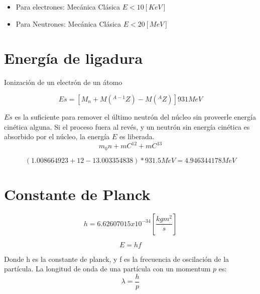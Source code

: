 \documentclass[]{article}
\begin{document}
\begin{itemize}
	\item Para electrones: Mecánica Clásica $E<10 [KeV]$
	\item Para Neutrones: Mecánica Clásica $E<20 [MeV]$
\end{itemize}









\section{Energía de ligadura}

Ionización de un electrón de un átomo

\begin{equation}
  Es=[M_n+M(^{A-1}Z)-M(^AZ)]931MeV
\end{equation}

$Es$ es la suficiente para remover el último neutrón del núcleo sin proveerle energía cinética alguna. Si el proceso fuera al revés, y un neutrón sin energía cinética es absorbido por el núcleo, la energía $E$ es liberada.\\

\begin{equation}
  m_0 n+mC^{12}+mC^{13}
\end{equation}

\begin{equation}
  (1.008664923+12-13.003354838)*931.5MeV=4.946344178MeV
\end{equation}


\section{Constante de Planck}


\begin{equation}
  h=6.62607015x10^{-34}[\frac{kgm^2}{s}]
\end{equation}

\begin{equation}
 E=hf
\end{equation}

Donde h es la constante de planck, y f es la frecuencia de oscilación de la partícula. La longitud de onda de una partícula con un momentum $p$ es:\\


\begin{equation}
   \lambda=\frac{h}{p}
\end{equation}
\end{document}
